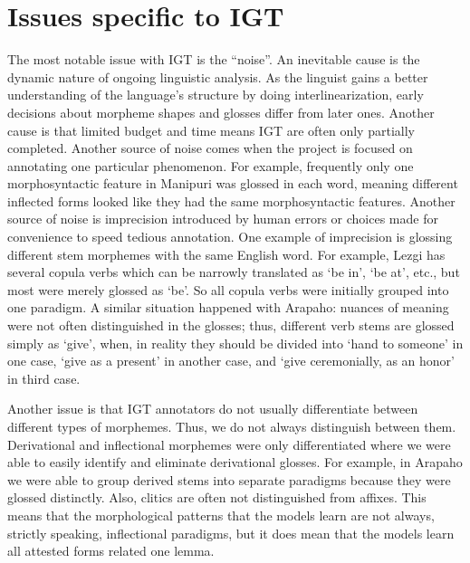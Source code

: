 \section{Issues specific to IGT}
\label{sec:issues}

The most notable issue with IGT is the ``noise''. An inevitable cause is the dynamic nature of ongoing linguistic analysis. As the linguist gains a better understanding of the language's structure by doing interlinearization, early decisions about morpheme shapes and glosses differ from later ones. Another cause is that limited budget and time means IGT are often only partially completed. Another source of noise comes when the project is focused on annotating one particular phenomenon. For example, frequently only one morphosyntactic feature in Manipuri was glossed in each word, meaning different inflected forms looked like they had the same morphosyntactic features. Another source of noise is imprecision introduced by human errors or choices made for convenience to speed tedious annotation. One example of imprecision is glossing different stem morphemes with the same English word. For example, Lezgi has several copula verbs which can be narrowly translated as `be in', `be at', etc., but most were merely glossed as `be'. So all copula verbs were initially grouped into one paradigm. A similar situation happened with Arapaho: nuances of meaning were not often distinguished in the glosses; thus, different verb stems are glossed simply as ‘give’, when, in reality they should be divided into ‘hand to someone’ in one case, ‘give as a present’ in another case, and ‘give ceremonially, as an honor’ in third case.

Another issue is that IGT annotators do not usually differentiate between different types of morphemes. Thus, we do not always distinguish between them. Derivational and inflectional morphemes were only differentiated where we were able to easily identify and eliminate derivational glosses. For example, in Arapaho we were able to group derived stems into separate paradigms because they were glossed distinctly. Also, clitics are often not distinguished from affixes. This means that the morphological patterns that the models learn are not always, strictly speaking, inflectional paradigms, but it does mean that the models learn all attested forms related one lemma.


